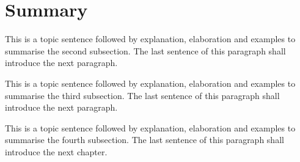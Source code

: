 \section{Summary}
\label{sec:ch_3_summary}

This is a topic sentence followed by explanation, elaboration and examples to summarise the second subsection. The last sentence of this paragraph shall introduce the next paragraph. \lipsum[1]

This is a topic sentence followed by explanation, elaboration and examples to summarise the third subsection. The last sentence of this paragraph shall introduce the next paragraph. \lipsum[1]

This is a topic sentence followed by explanation, elaboration and examples to summarise the fourth subsection. The last sentence of this paragraph shall introduce the next chapter. \lipsum[1]









